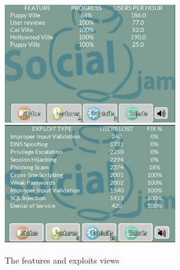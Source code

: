 \documentclass[letterpaper]{article}
\begin{document}
\begin{figure}\centering
\begin{framed}
\includegraphics[width=3in]{images/features.png}
\includegraphics[width=3in]{images/exploits.png}
\caption{The features and exploits views}
\label{fig:features-and-exploits}
\end{framed}
\end{figure}
\end{document}
